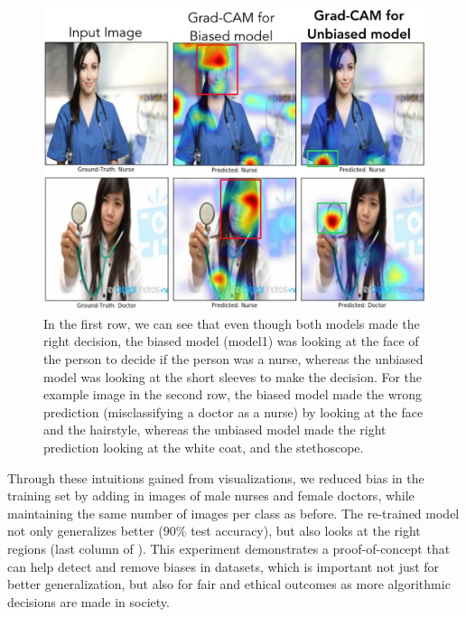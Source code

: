\begin{figure}[htp]
 \centering
 \includegraphics[width=1\linewidth]{figures/bias_qualitative.jpg}
 \caption{In the first row, we can see that even though both models made the right decision, the biased model (model1) was looking at the face of the person to decide if the person was a nurse, whereas the unbiased model was looking at the short sleeves to make the decision. For the example image in the second row, the biased model made the wrong prediction (misclassifying a doctor as a nurse) by looking at the face and the hairstyle, whereas the unbiased model made the right prediction looking at the white coat, and the stethoscope.
 }
 \label{fig:bias_qual}
\end{figure}

Through these intuitions gained from \gcam{} visualizations,
we reduced bias in the training set by adding in images of male nurses and female doctors,
while maintaining the same number of images per class as before.
The re-trained model not only generalizes better ($90$\% test accuracy),
but also looks at the right regions (last column of ).
This experiment demonstrates a proof-of-concept that \gcam{} can help detect and
remove biases in datasets, which is important not just for better generalization,
but also for fair and ethical outcomes as more algorithmic decisions are made in society.





